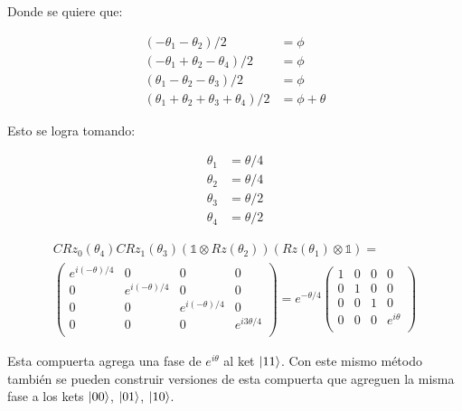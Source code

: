 Donde se quiere que:

\begin{align}
    (-\theta_1 - \theta_2)/2 &= \phi \\
    (-\theta_1+\theta_2-\theta_4)/2 &= \phi \\
    (\theta_1 - \theta_2 - \theta_3)/2 &= \phi \\
    (\theta_1 + \theta_2 + \theta_3 + \theta_4)/2 &= \phi + \theta
\end{align}

Esto se logra tomando:

\begin{align}
    \theta_1 &= \theta/4\\
    \theta_2 &= \theta/4\\
    \theta_3 &= \theta/2\\
    \theta_4 &= \theta/2
\end{align}

\begin{multline}
    CRz_0(\theta_4) CRz_1(\theta_3) (\mathds{1} \otimes Rz(\theta_2)) (Rz(\theta_1) \otimes \mathds{1}) = \\
    \begin{pmatrix}
        e^{i(-\theta)/4} & 0 & 0 & 0 \\
        0 & e^{i(-\theta)/4} & 0 & 0 \\
        0 & 0 & e^{i(- \theta)/4} & 0 \\
        0 & 0 & 0 & e^{i 3\theta/4} \\
    \end{pmatrix} =
    e^{- \theta/4} \begin{pmatrix}
        1 & 0 & 0 & 0 \\
        0 & 1 & 0 & 0 \\
        0 & 0 & 1 & 0 \\
        0 & 0 & 0 & e^{i \theta} \\
    \end{pmatrix}
\end{multline}

Esta compuerta agrega una fase de $e^{i \theta}$ al ket $\ket{11}$. Con este mismo método también se pueden construir versiones de esta compuerta que agreguen la misma fase a los kets $\ket{00}$, $\ket{01}$, $\ket{10}$.

